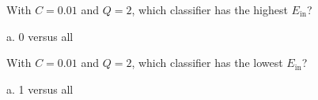 \documentclass[answers]{exam}
\begin{document}
\begin{questions}
\setcounter{question}{1}
\question With \(C = 0.01\) and \(Q = 2\), which classifier has the highest 
\(E_{\text{in}}\)?

\begin{solution}
a. 0 versus all
\end{solution}

\question With \(C = 0.01\) and \(Q = 2\), which classifier has the lowest 
\(E_{\text{in}}\)?

\begin{solution}
a. 1 versus all
\end{solution}


\end{questions}
\end{document}
